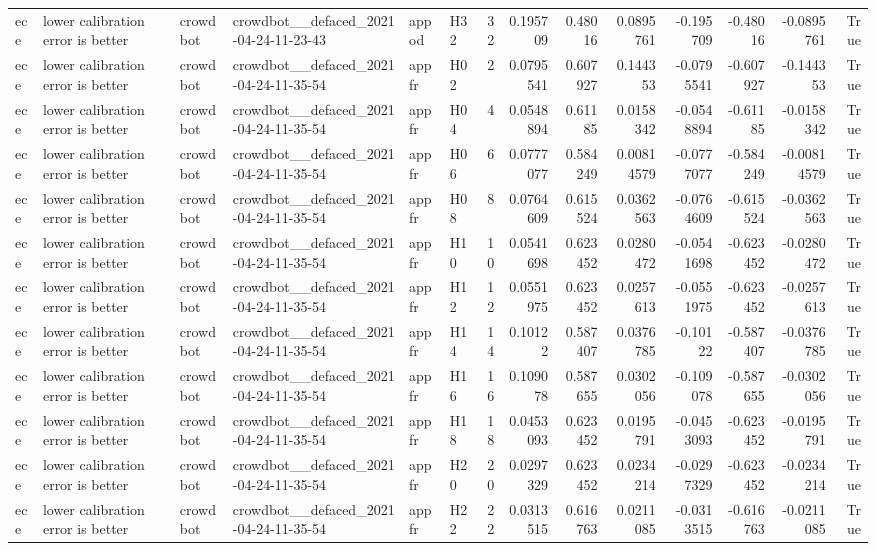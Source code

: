 \begin{longtable}{llllllrrrrrrrr}
ece & lower calibration error is better & crowdbot & crowdbot\_\_defaced\_2021-04-24-11-23-43 & appod & H32 & 32 & 0.195709 & 0.48016 & 0.0895761 & -0.195709 & -0.48016 & -0.0895761 & True \\
ece & lower calibration error is better & crowdbot & crowdbot\_\_defaced\_2021-04-24-11-35-54 & appfr & H02 & 2 & 0.0795541 & 0.607927 & 0.144353 & -0.0795541 & -0.607927 & -0.144353 & True \\
ece & lower calibration error is better & crowdbot & crowdbot\_\_defaced\_2021-04-24-11-35-54 & appfr & H04 & 4 & 0.0548894 & 0.61185 & 0.0158342 & -0.0548894 & -0.61185 & -0.0158342 & True \\
ece & lower calibration error is better & crowdbot & crowdbot\_\_defaced\_2021-04-24-11-35-54 & appfr & H06 & 6 & 0.0777077 & 0.584249 & 0.00814579 & -0.0777077 & -0.584249 & -0.00814579 & True \\
ece & lower calibration error is better & crowdbot & crowdbot\_\_defaced\_2021-04-24-11-35-54 & appfr & H08 & 8 & 0.0764609 & 0.615524 & 0.0362563 & -0.0764609 & -0.615524 & -0.0362563 & True \\
ece & lower calibration error is better & crowdbot & crowdbot\_\_defaced\_2021-04-24-11-35-54 & appfr & H10 & 10 & 0.0541698 & 0.623452 & 0.0280472 & -0.0541698 & -0.623452 & -0.0280472 & True \\
ece & lower calibration error is better & crowdbot & crowdbot\_\_defaced\_2021-04-24-11-35-54 & appfr & H12 & 12 & 0.0551975 & 0.623452 & 0.0257613 & -0.0551975 & -0.623452 & -0.0257613 & True \\
ece & lower calibration error is better & crowdbot & crowdbot\_\_defaced\_2021-04-24-11-35-54 & appfr & H14 & 14 & 0.10122 & 0.587407 & 0.0376785 & -0.10122 & -0.587407 & -0.0376785 & True \\
ece & lower calibration error is better & crowdbot & crowdbot\_\_defaced\_2021-04-24-11-35-54 & appfr & H16 & 16 & 0.109078 & 0.587655 & 0.0302056 & -0.109078 & -0.587655 & -0.0302056 & True \\
ece & lower calibration error is better & crowdbot & crowdbot\_\_defaced\_2021-04-24-11-35-54 & appfr & H18 & 18 & 0.0453093 & 0.623452 & 0.0195791 & -0.0453093 & -0.623452 & -0.0195791 & True \\
ece & lower calibration error is better & crowdbot & crowdbot\_\_defaced\_2021-04-24-11-35-54 & appfr & H20 & 20 & 0.0297329 & 0.623452 & 0.0234214 & -0.0297329 & -0.623452 & -0.0234214 & True \\
ece & lower calibration error is better & crowdbot & crowdbot\_\_defaced\_2021-04-24-11-35-54 & appfr & H22 & 22 & 0.0313515 & 0.616763 & 0.0211085 & -0.0313515 & -0.616763 & -0.0211085 & True \\

\end{longtable}
